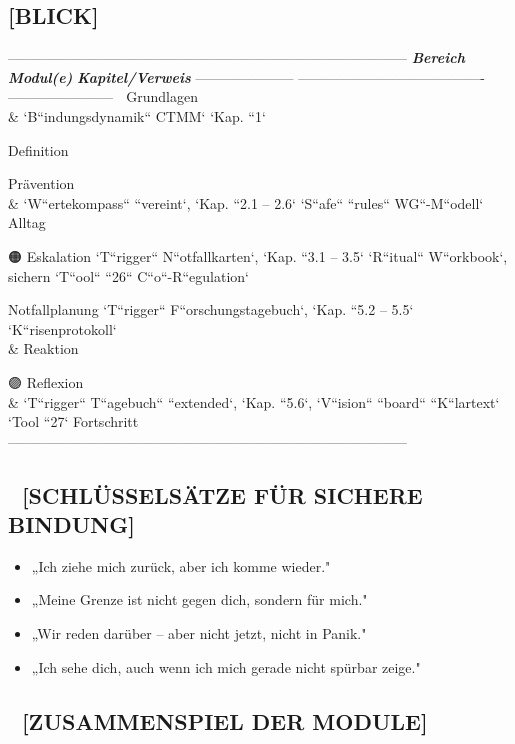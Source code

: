 \subsection{ \textbf{[BLICK]}}

--------------------------------------------------------------------------------------
\textbf{\textit{Bereich}}         \textbf{\textit{Modul(e)}}                           \textbf{\textit{Kapitel/Verweis}}
--------------------- ---------------------------------------- -----------------------
🔵 Grundlagen \\&       `B``indungsdynamik`` \textcolor{ctmmBlue}{CTMM}`               `Kap. ``1`

Definition

\textcolor{ctmmGreen}{\faCircle} Prävention \\&       `W``ertekompass`` ``vereint`,            `Kap. ``2.1 -- 2.6`
`S``afe`` ``rules`` WG``-M``odell`
Alltag

🟠 Eskalation         `T``rigger`` N``otfallkarten`,           `Kap. ``3.1 -- 3.5`
`R``itual`` W``orkbook`,
sichern               `T``ool`` ``26`` C``o``-R``egulation`

\textcolor{ctmmRed}{\faCircle} Notfallplanung     `T``rigger`` F``orschungstagebuch`,      `Kap. ``5.2 -- 5.5`
`K``risenprotokoll`
\\& Reaktion

🟣 Reflexion \\&        `T``rigger`` T``agebuch`` ``extended`,   `Kap. ``5.6`,
`V``ision`` ``board`` ``K``lartext`      `Tool ``27`
Fortschritt
--------------------------------------------------------------------------------------

\subsection{\textbf{💬 [SCHLÜSSELSÄTZE FÜR SICHERE BINDUNG]}}

\begin{itemize}
\item   „Ich ziehe mich zurück, aber ich komme wieder."
\item   „Meine Grenze ist nicht gegen dich, sondern für mich."
\item   „Wir reden darüber -- aber nicht jetzt, nicht in Panik."
\item   „Ich sehe dich, auch wenn ich mich gerade nicht spürbar zeige."
\end{itemize}

\subsection{\textbf{🔗 [ZUSAMMENSPIEL DER MODULE]}}

